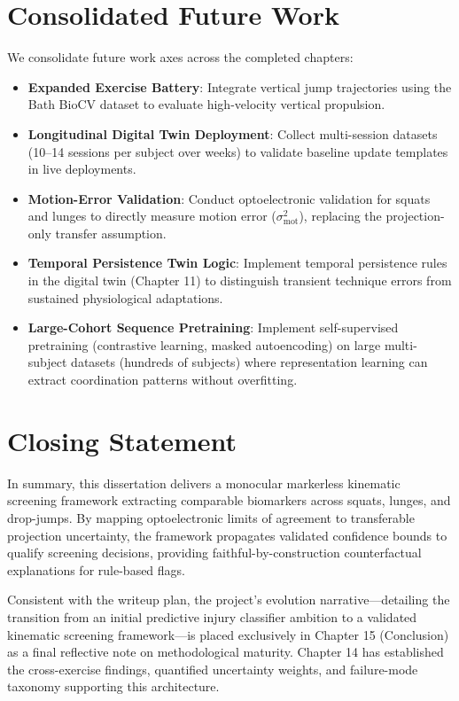 \section{Consolidated Future Work}
\label{sec:14-5-consolidated-future-work}


We consolidate future work axes across the completed chapters:
\begin{itemize}
  \item \textbf{Expanded Exercise Battery}: Integrate vertical jump trajectories using the Bath BioCV dataset to evaluate high-velocity vertical propulsion.
  \item \textbf{Longitudinal Digital Twin Deployment}: Collect multi-session datasets (10–14 sessions per subject over weeks) to validate baseline update templates in live deployments.
  \item \textbf{Motion-Error Validation}: Conduct optoelectronic validation for squats and lunges to directly measure motion error ($\sigma^2_{\text{mot}}$), replacing the projection-only transfer assumption.
  \item \textbf{Temporal Persistence Twin Logic}: Implement temporal persistence rules in the digital twin (Chapter 11) to distinguish transient technique errors from sustained physiological adaptations.
  \item \textbf{Large-Cohort Sequence Pretraining}: Implement self-supervised pretraining (contrastive learning, masked autoencoding) on large multi-subject datasets (hundreds of subjects) where representation learning can extract coordination patterns without overfitting.
\end{itemize}



\section{Closing Statement}
\label{sec:14-6-closing-statement}


In summary, this dissertation delivers a monocular markerless kinematic screening framework extracting comparable biomarkers across squats, lunges, and drop-jumps. By mapping optoelectronic limits of agreement to transferable projection uncertainty, the framework propagates validated confidence bounds to qualify screening decisions, providing faithful-by-construction counterfactual explanations for rule-based flags.

Consistent with the writeup plan, the project's evolution narrative—detailing the transition from an initial predictive injury classifier ambition to a validated kinematic screening framework—is placed exclusively in Chapter 15 (Conclusion) as a final reflective note on methodological maturity. Chapter 14 has established the cross-exercise findings, quantified uncertainty weights, and failure-mode taxonomy supporting this architecture.